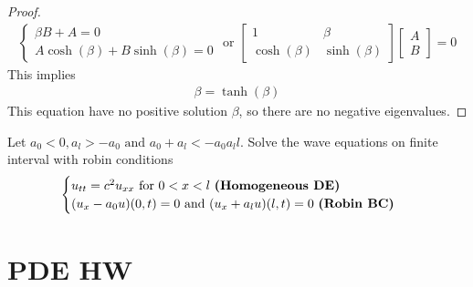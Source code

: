 \documentclass{report}
\begin{document}
\begin{proof}
\begin{align*}
\begin{cases}
  \beta  B +A =0 \\
  A \cosh (\beta )+B \sinh (\beta )=0
\end{cases} \text{ or }\begin{bmatrix}
1& \beta  \\
\cosh (\beta ) & \sinh (\beta )
\end{bmatrix}\begin{bmatrix}
A\\
B
\end{bmatrix}=0
\end{align*}
This implies 
\begin{align*}
\beta = \tanh (\beta )
\end{align*}
This equation have no positive solution $\beta $, so there are no negative eigenvalues. 
\end{proof}
\begin{question}{}{}
Let $a_0<0,a_l>-a_0\text{ and }a_0+a_l<-a_0a_ll$. Solve the wave equations on finite interval with robin conditions 
\begin{align*}
\begin{cases}
  u_{tt}=c^2u_{xx}\text{ for }0<x<l\text{ \textbf{(Homogeneous DE)} }\\
  (u_x-a_0u)(0,t)=0\text{ and }(u_x+a_lu)(l,t)=0\text{ \textbf{(Robin BC)} }
\end{cases}
\end{align*}
\end{question}
\chapter{PDE HW}
\end{document}
